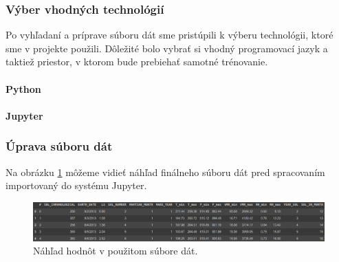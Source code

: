 \subsubsection{Výber vhodných technológií}
Po vyhľadaní a príprave súboru dát sme pristúpili k výberu technológii, ktoré sme v projekte použili. Dôležité bolo vybrať si vhodný programovací jazyk a taktiež priestor, v ktorom bude prebiehať samotné trénovanie.

\paragraph{Python}

\paragraph{Jupyter}



\subsubsection{Úprava súboru dát}
Na obrázku \ref{dataset} môžeme vidieť náhľad finálneho súboru dát pred spracovaním importovaný do systému Jupyter.
\begin{figure}[!htbp]
  \centering
  \includegraphics[width=14cm]{img/datase.png}
  \caption{Náhľad hodnôt v použitom súbore dát.}
  \label{dataset}
\end{figure}

